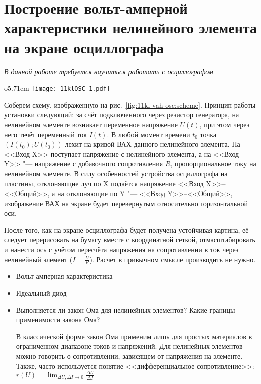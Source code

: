 \section{Построение вольт-амперной характеристики нелинейного элемента на экране осциллографа}
{\itshape В данной работе требуется научиться работать с осциллографом}
\SolveVariant
\begin{wrapfigure}{o}{5.71cm}
	\texttt{[image: 11klOSC-1.pdf]}
    \caption{Схема установки}
    \label{fig:11kl-vah-osc:scheme}
\end{wrapfigure}
Соберем схему, изображенную на рис.~\ref{fig:11kl-vah-osc:scheme}. Принцип работы установки следующий: за счёт подключенного через резистор генератора, на нелинейном элементе возникает переменное напряжение \(U(t)\), при этом через него течёт переменный ток \(I(t)\). В любой момент времени \(t_0\) точка \( \left( I(t_0); U(t_0) \right)\) лехит на кривой ВАХ данного нелинейного элемента. На <<Вход X>> поступает напряжение с нелинейного элемента, а на <<Вход Y>> "--- напряжение с добавочного сопротивления \(R\), пропорциональное току на нелинейном элементе. В силу особенностей устройства осциллографа на пластины, отклоняющие луч по X подаётся напряжение <<Вход X>>--<<Общий>>, а на отклоняющие по Y "--- <<Вход Y>>--<<Общий>>, изображение ВАХ на экране будет перевернутым относительно горизонтальной оси.\par
После того, как на экране осциллографа будет получена устойчивая картина, её следует перерисовать на бумагу вместе с координатной сеткой, отмасштабировать и нанести ось с учётом пересчёта напряжения на сопротивлении в ток через нелинейный элемент (\(I = \frac{U}{R}\)).
\MesErrors
Расчет в привычном смысле производить не нужно.
\SchoolBase
\begin{itemize}
    \item Вольт-амперная характеристика
    \item Идеальный диод
\end{itemize}
\AdditionalQuestions
\begin{itemize}
    \item Выполняется ли закон Ома для нелинейных элементов? Какие границы применимости закона Ома?\par
    \Answer В классической форме закон Ома применим лишь для простых материалов в ограниченном диапазоне токов и напряжений. Для нелинейных элементов можно говорить о сопротивлении, зависящем от напряжения на элементе. Также, часто используется понятие <<дифференциальное сопротивление>>: $r(U) = \lim _ {\Delta U, \Delta I \rightarrow 0}\frac{\Delta U}{\Delta I}$
\end{itemize}
